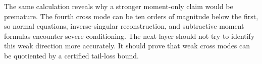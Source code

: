 \documentclass[11pt]{article}
\theoremstyle{definition}
\theoremstyle{remark}
\begin{document}
The same calculation reveals why a stronger moment-only claim would be
premature.  The fourth cross mode can be ten orders of magnitude below the
first, so normal equations, inverse-singular reconstruction, and subtractive
moment formulas encounter severe conditioning.  The next layer should not
try to identify this weak direction more accurately.  It should prove that
weak cross modes can be quotiented by a certified tail-loss bound.



\end{document}
